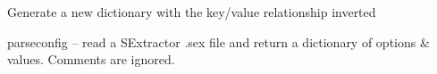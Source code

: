 \documentclass[letterpaper,10pt,english]{sphinxmanual}
\begin{document}

\begin{fulllineitems}
\label{SamPy.smnIO:SamPy.smnIO.sextutils.invert_dict}
Generate a new dictionary with the key/value relationship inverted

\end{fulllineitems}



\begin{fulllineitems}
\label{SamPy.smnIO:SamPy.smnIO.sextutils.parseconfig_se}
parseconfig -- read a SExtractor .sex file and return a dictionary
of options \& values. Comments are ignored.

\end{fulllineitems}


\end{document}
